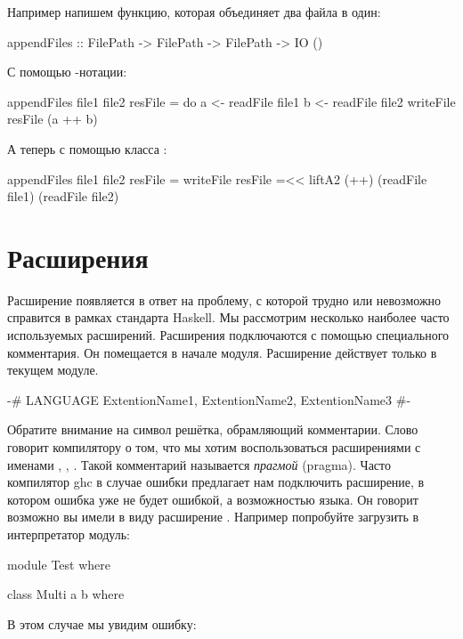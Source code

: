 Например напишем функцию, которая объединяет два файла
в один:

\begin{code}
appendFiles :: FilePath -> FilePath -> FilePath -> IO ()
\end{code}

 С помощью -нотации:

\begin{code}
appendFiles file1 file2 resFile = do
	a <- readFile file1
	b <- readFile file2
	writeFile resFile (a ++ b)	
\end{code}

А теперь с помощью класса :

\begin{code}
appendFiles file1 file2 resFile = writeFile resFile =<< 
	liftA2 (++) (readFile file1) (readFile file2)
\end{code}

\section{Расширения}

Расширение появляется в ответ на проблему, с которой трудно 
или невозможно справится 
в рамках стандарта Haskell. Мы рассмотрим несколько 
наиболее часто используемых расширений. 
Расширения подключаются с помощью специального
комментария. Он помещается в начале модуля. 
Расширение действует только в текущем модуле.

\begin{code}
{-# LANGUAGE  ExtentionName1, ExtentionName2, ExtentionName3 #-}
\end{code}

Обратите внимание на символ решётка, обрамляющий комментарии.
Слово  говорит компилятору о том, что мы хотим
воспользоваться расширениями с именами ,
, .
Такой комментарий называется \emph{прагмой} (pragma).
Часто компилятор ghc в случае ошибки предлагает
нам подключить расширение, в котором ошибка уже не будет
ошибкой, а возможностью языка. Он говорит возможно вы 
имели в виду расширение . Например попробуйте
загрузить в интерпретатор модуль:

\begin{code}
module Test where

class Multi a b where
\end{code}

В этом случае мы увидим ошибку:

